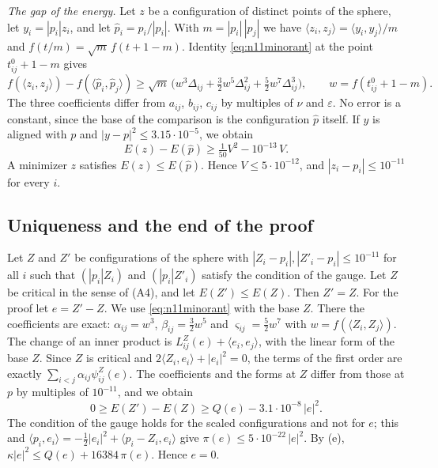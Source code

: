 \documentclass[reqno,a4paper,11pt]{amsart}
\numberwithin{equation}{section}
\begin{document}
\emph{The gap of the energy.} Let $z$ be a configuration of distinct points of the sphere, let $y_i = |p_i| z_i$, and let $\hat p_i = p_i / |p_i|$. With $m = |p_i| \, |p_j|$ we have $\langle z_i, z_j \rangle = \langle y_i, y_j \rangle / m$ and $f(t/m) = \sqrt m \, f(t + 1 - m)$. Identity \eqref{eq:n11minorant} at the point $t^0_{ij} + 1 - m$ gives
$$
f(\langle z_i, z_j \rangle) - f(\langle \hat p_i, \hat p_j \rangle) \geq \sqrt m \, \bigl( w^3 \Delta_{ij} + \tfrac32 w^5 \Delta_{ij}^2 + \tfrac52 w^7 \Delta_{ij}^3 \bigr), \qquad w = f(t^0_{ij} + 1 - m) .
$$
The three coefficients differ from $a_{ij}$, $b_{ij}$, $c_{ij}$ by multiples of $\nu$ and $\varepsilon$. No error is a constant, since the base of the comparison is the configuration $\hat p$ itself. If $y$ is aligned with $p$ and $|y - p|^2 \leq 3.15 \cdot 10^{-5}$, we obtain
$$
E(z) - E(\hat p) \geq \tfrac{1}{50} V^2 - 10^{-13} \, V .
$$
A minimizer $z$ satisfies $E(z) \leq E(\hat p)$. Hence $V \leq 5 \cdot 10^{-12}$, and $|z_i - p_i| \leq 10^{-11}$ for every $i$.

\subsection{Uniqueness and the end of the proof}

Let $Z$ and $Z'$ be configurations of the sphere with $|Z_i - p_i|, |Z'_i - p_i| \leq 10^{-11}$ for all $i$ such that $(|p_i| Z_i)$ and $(|p_i| Z'_i)$ satisfy the condition of the gauge. Let $Z$ be critical in the sense of (A4), and let $E(Z') \leq E(Z)$. Then $Z' = Z$. For the proof let $e = Z' - Z$. We use \eqref{eq:n11minorant} with the base $Z$. There the coefficients are exact: $\alpha_{ij} = w^3$, $\beta_{ij} = \tfrac32 w^5$ and $\varsigma_{ij} = \tfrac52 w^7$ with $w = f(\langle Z_i, Z_j \rangle)$. The change of an inner product is $L^Z_{ij}(e) + \langle e_i, e_j \rangle$, with the linear form of the base $Z$. Since $Z$ is critical and $2 \langle Z_i, e_i \rangle + |e_i|^2 = 0$, the terms of the first order are exactly $\sum_{i<j} \alpha_{ij} \psi^Z_{ij}(e)$. The coefficients and the forms at $Z$ differ from those at $p$ by multiples of $10^{-11}$, and we obtain
$$
0 \geq E(Z') - E(Z) \geq Q(e) - 3.1 \cdot 10^{-8} \, |e|^2 .
$$
The condition of the gauge holds for the scaled configurations and not for $e$; this and $\langle p_i, e_i \rangle = -\tfrac12 |e_i|^2 + \langle p_i - Z_i, e_i \rangle$ give $\pi(e) \leq 5 \cdot 10^{-22} \, |e|^2$. By (e), $\kappa |e|^2 \leq Q(e) + 16384 \, \pi(e)$. Hence $e = 0$.
\end{document}
